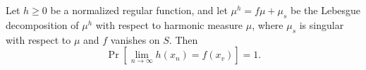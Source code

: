 Let $h \geq 0$ be a normalized regular function, and let $\mu^h = f \mu + \mu_s$ be the Lebesgue decomposition of $\mu^h$ with respect to harmonic measure $\mu$, where $\mu_s$ is singular with respect to $\mu$ and $f$ vanishes on $S$. Then
$$\Pr\left[\lim_{n \to \infty} h(x_n) = f(x_v)\right] = 1.$$
